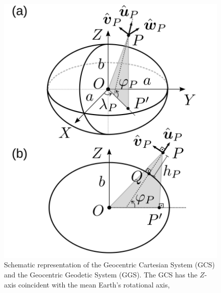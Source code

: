 \documentclass[extra]{gji}
\begin{document}




\appendix
%
%
%
%

\begin{figure}
    \includegraphics{figures/cartesian-geodetic-systems.png}
    \caption{Schematic representation of the Geocentric Cartesian System (GCS) and the Geocentric Geodetic System (GGS). The GCS has the $Z$-axis coincident with the mean Earth's rotational axis,
}
\end{figure}
\end{document}

